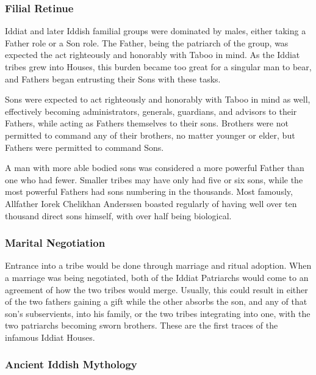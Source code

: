 			\subsubsection{Filial Retinue}
			Iddiat and later Iddish familial groups were dominated by males, either taking a Father role or a Son role. The Father, being the patriarch of the group, was expected the act righteously and honorably with Taboo in mind. As the Iddiat tribes grew into Houses, this burden became too great for a singular man to bear, and Fathers began entrusting their Sons with these tasks.\par
			
			Sons were expected to act righteously and honorably with Taboo in mind as well, effectively becoming administrators, generals, guardians, and advisors to their Fathers, while acting as Fathers themselves to their sons. Brothers were not permitted to command any of their brothers, no matter younger or elder, but Fathers were permitted to command Sons.\par
			
			A man with more able bodied sons was considered a more powerful Father than one who had fewer. Smaller tribes may have only had five or six sons, while the most powerful Fathers had sons numbering in the thousands. Most famously, Allfather Iorek Chelikhan Anderssen boasted regularly of having well over ten thousand direct sons himself, with over half being biological.\par
			
			\subsubsection{Marital Negotiation}
			Entrance into a tribe would be done through marriage and ritual adoption. When a marriage was being negotiated, both of the Iddiat Patriarchs would come to an agreement of how the two tribes would merge. Usually, this could result in either of the two fathers gaining a gift while the other absorbs the son, and any of that son's subservients, into his family, or the two tribes integrating into one, with the two patriarchs becoming sworn brothers. These are the first traces of the infamous Iddiat Houses.\par
			
			\subsubsection{Ancient Iddish Mythology}
